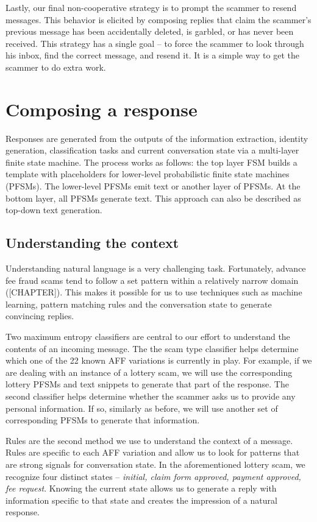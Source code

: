 Lastly, our final non-cooperative strategy is to prompt the scammer to resend messages. This behavior is elicited by composing replies that claim the scammer's previous message has been accidentally deleted, is garbled, or has never been received. This strategy has a single goal -- to force the scammer to look through his inbox, find the correct message, and resend it. It is a simple way to get the scammer to do extra work.

\section{Composing a response}

Responses are generated from the outputs of the information extraction, identity generation, classification tasks and current conversation state via a multi-layer finite state machine. The process works as follows: the top layer FSM builds a template with placeholders for lower-level probabilistic finite state machines (PFSMs). The lower-level PFSMs emit text or another layer of PFSMs. At the bottom layer, all PFSMs generate text. This approach can also be described as top-down text generation.

\subsection{Understanding the context}

Understanding natural language is a very challenging task. Fortunately, advance fee fraud scams tend to follow a set pattern within a relatively narrow domain ([CHAPTER]). This makes it possible for us to use techniques such as machine learning, pattern matching rules and the conversation state to generate convincing replies.

Two maximum entropy classifiers are central to our effort to understand the contents of an incoming message. The the scam type classifier helps determine which one of the 22 known AFF variations is currently in play. For example, if we are dealing with an instance of a lottery scam, we will use the corresponding lottery PFSMs and text snippets to generate that part of the response. The second classifier helps determine whether the scammer asks us to provide any personal information. If so, similarly as before, we will use another set of corresponding PFSMs to generate that information.

Rules are the second method we use to understand the context of a message. Rules are specific to each AFF variation and allow us to look for patterns that are strong signals for conversation state. In the aforementioned lottery scam, we recognize four distinct states -- \textit{initial, claim form approved, payment approved, fee request}. Knowing the current state allows us to generate a reply with information specific to that state and creates the impression of a natural response.

